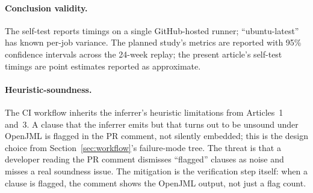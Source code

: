 \paragraph{Conclusion validity.}
The self-test reports timings on a single GitHub-hosted runner; ``ubuntu-latest'' has known per-job variance. The planned study's metrics are reported with 95\% confidence intervals across the 24-week replay; the present article's self-test timings are point estimates reported as approximate.

\paragraph{Heuristic-soundness.}
The CI workflow inherits the inferrer's heuristic limitations from Articles~1 and~3. A clause that the inferrer emits but that turns out to be unsound under OpenJML is flagged in the PR comment, not silently embedded; this is the design choice from Section~\ref{sec:workflow}'s failure-mode tree. The threat is that a developer reading the PR comment dismisses ``flagged'' clauses as noise and misses a real soundness issue. The mitigation is the verification step itself: when a clause is flagged, the comment shows the OpenJML output, not just a flag count.

